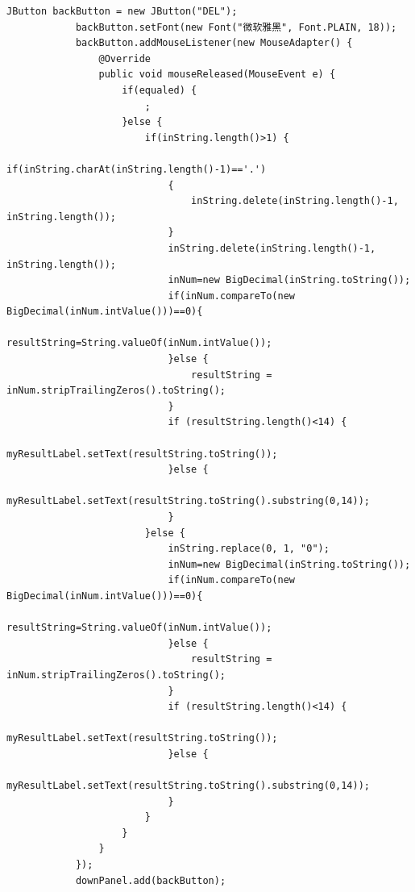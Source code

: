 \documentclass{ctexart}
\begin{document}
\begin{lstlisting}[caption=冗杂的代码]
            JButton backButton = new JButton("DEL");
            backButton.setFont(new Font("微软雅黑", Font.PLAIN, 18));
            backButton.addMouseListener(new MouseAdapter() {
                @Override
                public void mouseReleased(MouseEvent e) {
                    if(equaled) {
                        ;
                    }else {
                        if(inString.length()>1) {
                            if(inString.charAt(inString.length()-1)=='.')
                            {
                                inString.delete(inString.length()-1, inString.length());
                            }
                            inString.delete(inString.length()-1, inString.length());
                            inNum=new BigDecimal(inString.toString());
                            if(inNum.compareTo(new BigDecimal(inNum.intValue()))==0){
                                resultString=String.valueOf(inNum.intValue());
                            }else {
                                resultString = inNum.stripTrailingZeros().toString();
                            }
                            if (resultString.length()<14) {
                                myResultLabel.setText(resultString.toString());
                            }else {
                                myResultLabel.setText(resultString.toString().substring(0,14));
                            }
                        }else {
                            inString.replace(0, 1, "0");
                            inNum=new BigDecimal(inString.toString());
                            if(inNum.compareTo(new BigDecimal(inNum.intValue()))==0){
                                resultString=String.valueOf(inNum.intValue());
                            }else {
                                resultString = inNum.stripTrailingZeros().toString();
                            }
                            if (resultString.length()<14) {
                                myResultLabel.setText(resultString.toString());
                            }else {
                                myResultLabel.setText(resultString.toString().substring(0,14));
                            }
                        }
                    }
                }
            });
            downPanel.add(backButton);
            

\end{lstlisting}
\end{document}
